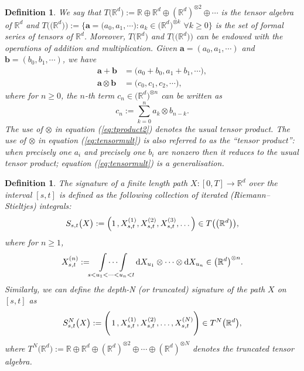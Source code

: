 \documentclass{article}
\newcommand{\R}{\mathbb{R}}
\newtheorem{definition}[theorem]{Definition}
\newcommand{\dby}{\mathrm{d}}
\begin{document}
\begin{definition}\label{def:tensoralgebras}
We say that $T\big(\R^d\big):= \R \oplus \R^d \oplus (\R^d)^{\otimes 2}\oplus\cdots$ is the \emph{tensor algebra} of $\R^d$ and $T\big(\big(\R^d\big)\big):=\big\{\boldsymbol{a} = \big(a_{0}, a_{1}, \cdots\big) : a_{k}\in\big(\R^d\big)^{\otimes k}\,\,\forall k\geq 0\big\}$ is the set of formal series of tensors of $\R^d$.
Moreover, $T\big(\R^d\big)$ and $T\big(\big(\R^d\big)\big)$ can be endowed with the operations
of addition and multiplication.
Given $\boldsymbol{a} = (a_{0}, a_{1}, \cdots)$ and $\boldsymbol{b} = (b_{0}, b_{1}, \cdots)$, we have
\begin{align}
\boldsymbol{a} + \boldsymbol{b} & =\big(a_{0} + b_{0}, a_{1} + b_{1}, \cdots\big),\label{eq:tensoradd}\\
\boldsymbol{a} \otimes \boldsymbol{b} & =\big(c_{0}, c_{1}, c_{2}, \cdots\big),\label{eq:tensormult}
\end{align}
where for $n\geq 0$, the $n$-th term $c_{n}\in\big(\R^d\big)^{\otimes n}$ can be written as
\begin{equation}\label{eq:tproduct2}
c_{n} := \sum_{k=0}^{n}a_{k}\otimes b_{n-k}.
\end{equation}
The use of $\otimes$ in equation (\ref{eq:tproduct2}) denotes the usual tensor product. The use of $\otimes$ in equation (\ref{eq:tensormult}) is \textit{also} referred to as the ``tensor product'': when precisely one $a_i$ and precisely one $b_i$ are nonzero then it reduces to the usual tensor product; equation (\ref{eq:tensormult}) is a generalisation.
\end{definition}\medbreak

\begin{definition}\label{def:signature_appendix}
The \emph{signature} of a finite length path $X : [0,T]\rightarrow\R^d$ over
the interval $[s,t]$ is defined as the following collection of iterated (Riemann--Stieltjes) integrals:
\begin{equation}\label{eq:fullsig}
S_{s,t}\big(X\big) := \Big(1\hspace{0.5mm}, X_{s,t}^{(1)}, X_{s,t}^{(2)}, X_{s,t}^{(3)},\ldots\Big)\in T\big(\big(\R^d\big)\big),
\end{equation}
where for $n\geq 1$,
\begin{equation}
X_{s,t}^{(n)} := \idotsint\displaylimits_{s<u_{1}<\cdots<u_{n}<t}\dby X_{u_{1}}\otimes\cdots\otimes \dby X_{u_{n}}\in\big(\R^d\big)^{\otimes n}.\nonumber
\end{equation}
Similarly, we can define the depth-N (or truncated) signature of the path $X$ on $[s,t]$ as
\begin{equation}\label{eq:truncsig}
S_{s,t}^{N}\big(X\big) := \Bigg(\hspace{0.5mm}1\hspace{0.5mm}, X_{s,t}^{(1)}, X_{s,t}^{(2)},\ldots,X_{s,t}^{(N)}\Bigg)\in T^N\big(\R^d\big),
\end{equation}
where $T^N\big(\R^d\big):= \R \oplus \R^d \oplus (\R^d)^{\otimes 2}\oplus\cdots\oplus (\R^d)^{\otimes N}$ denotes the truncated tensor algebra.
\end{definition}
\end{document}
